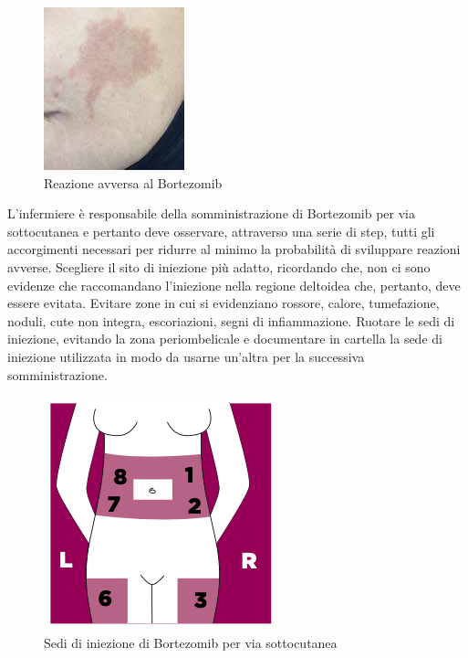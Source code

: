 \begin{figure}[H]
    \begin{center}
    \includegraphics[width=0.3\columnwidth]{img/bortezomibreaction2.jpeg}
    \vspace{-3mm}
    \end{center}
    \caption{ Reazione avversa al Bortezomib
    \cite{BORTNURSES}}
    \label{fig:FIGURE_3.4}
\end{figure}

L’infermiere è responsabile della somministrazione di Bortezomib per via sottocutanea e pertanto deve osservare,
attraverso una serie di step, tutti gli accorgimenti necessari per ridurre al minimo la probabilità di sviluppare 
reazioni avverse. 
Scegliere il sito di iniezione più adatto, ricordando che, non ci sono evidenze che raccomandano l’iniezione 
nella regione deltoidea che, pertanto, deve essere evitata. Evitare zone in cui si evidenziano rossore, calore, 
tumefazione, noduli, cute non integra, escoriazioni, segni di infiammazione. Ruotare le sedi di iniezione, evitando 
la zona periombelicale e documentare in cartella la sede di iniezione utilizzata in modo da usarne 
un’altra per la successiva somministrazione\cite{BORTNURSES}.\\

\begin{figure}[H]
    \begin{center}
    \includegraphics[width=0.3\columnwidth]{img/SEDI.png}
    \vspace{-3mm}
    \end{center}
    \caption{ Sedi di iniezione di Bortezomib per via sottocutanea
    \cite{BORTEZOMIB}}

\end{figure}

